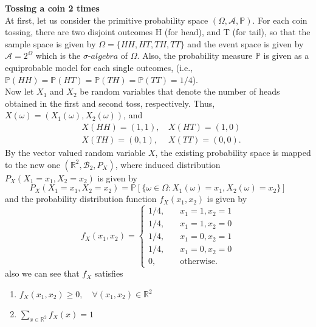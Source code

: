 \documentclass[twoside]{article}
\makeatletter
\theoremstyle{definition}
\theoremstyle{remark}
\theoremstyle{remark}
\newenvironment{example}
 {\patchcmd{\@thm}{\trivlist}{\list{}{\leftmargin=3em \rightmargin=3em}}{}{}%
  \vspace*{10\p@}
  \innerexample\pushQED{\hfill\ensuremath{\Diamond}}}
 {\popQED\endinnerexample}
\makeatother
\begin{document}
\begin{example}
  {\bf Tossing a coin 2 times} \\
  At first, let us consider the primitive probability space $(\Omega, \mathcal{A},
  \mathbb{P})$. For each coin tossing, there are two disjoint outcomes H (for head),
  and T (for tail), so that the sample space is given by $\Omega = {\{HH, HT, TH, TT\}}$
  and the event space is given by $\mathcal{A} = 2^{\Omega}$ which is the $\sigma$-$algebra$
  of $\Omega$. Also, the probability measure $\mathbb{P}$ is given as a equiprobable
  model for each single outcomes, (i.e., $\mathbb{P}(HH) = \mathbb{P}(HT) = \mathbb{P}(TH)
  = \mathbb{P}(TT) = 1/4$). \\[0.5\baselineskip]
  Now let $X_1$ and $X_2$ be random variables that denote the number of heads
  obtained in the first and second toss, respectively. Thus, $X(\omega) = (X_1(\omega), X_2(\omega))$,
  and
  \begin{equation*}
    \begin{array}{rll}
      &X(HH) = (1, 1),\, &X(HT) = (1, 0) \\
      &X(TH) = (0, 1),\, &X(TT) = (0, 0).
    \end{array}
  \end{equation*}
  By the vector valued random variable $X$, the existing probability space is
  mapped to the new one $(\mathbb{R}^2, \mathcal{B}_2, P_X)$, where induced
  distribution $P_X(X_1 = x_1, X_2 = x_2)$ is given by
  \begin{equation*}
    P_X(X_1 = x_1, X_2 = x_2) = \mathbb{P}[\{ \omega \in \Omega : X_1(\omega) = x_1, X_2(\omega) = x_2\}]
  \end{equation*}
  and the probability distribution function $f_X(x_1, x_2)$ is given by
  \begin{equation*}
    f_X(x_1, x_2) = \left\{
    \begin{array}{ll}
      1/4, \quad & x_1 = 1, x_2 = 1 \\
      1/4, \quad & x_1 = 1, x_2 = 0 \\
      1/4, \quad & x_1 = 0, x_2 = 1 \\
      1/4, \quad & x_1 = 0, x_2 = 0 \\
      0  , \quad & \textrm{otherwise.}
    \end{array}
    \right.
  \end{equation*}
  also we can see that $f_X$ satisfies
  \begin{enumerate}
    \item $f_X(x_1, x_2) \geq 0, \quad \forall (x_1, x_2) \in \mathbb{R}^2$
    \item $\sum_{x \in \mathbb{R}^2} f_X(x) = 1$
  \end{enumerate}
\end{example}
\end{document}

